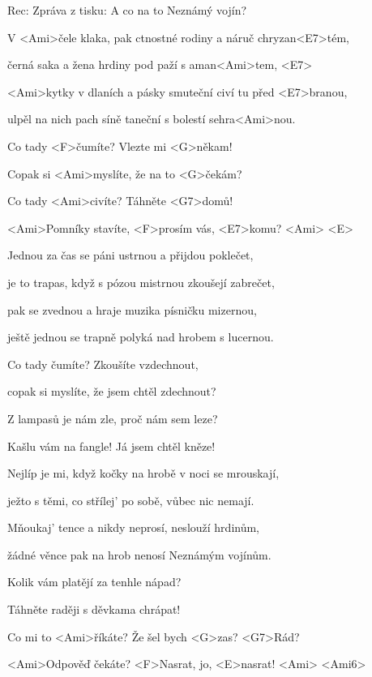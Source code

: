 

Rec: Zpráva z tisku:  A co na to Neznámý vojín?

\zs
V <Ami>čele klaka, pak ctnostné rodiny a náruč chryzan<E7>tém,

černá saka a žena hrdiny pod paží s aman<Ami>tem, <E7>

<Ami>kytky v dlaních a pásky smuteční civí tu před <E7>branou,

ulpěl na nich pach síně taneční s bolestí sehra<Ami>nou.
\ks

\zr
Co tady <F>čumíte? Vlezte mi <G>někam!

Copak si <Ami>myslíte, že na to <G>čekám?

Co tady <Ami>civíte? Táhněte <G7>domů!

<Ami>Pomníky stavíte, <F>prosím vás, <E7>komu? <Ami> <E>
\kr

\zs
Jednou za čas se páni ustrnou a přijdou poklečet,

je to trapas, když s pózou mistrnou zkoušejí zabrečet,

pak se zvednou a hraje muzika písničku mizernou,

ještě jednou se trapně polyká nad hrobem s lucernou.
\ks

\zr
Co tady čumíte? Zkoušíte vzdechnout,

copak si myslíte, že jsem chtěl zdechnout?

Z lampasů je nám zle, proč nám sem leze?

Kašlu vám na fangle! Já jsem chtěl kněze!
\kr

\zs
Nejlíp je mi, když kočky na hrobě v noci se mrouskají,

ježto s těmi, co střílej' po sobě, vůbec nic nemají.

Mňoukaj' tence a nikdy neprosí, neslouží hrdinům,

žádné věnce pak na hrob nenosí Neznámým vojínům.
\ks

\zr
Kolik vám platějí za tenhle nápad?

Táhněte raději s děvkama chrápat!

Co mi to <Ami>říkáte? Že šel bych <G>zas? <G7>Rád?

<Ami>Odpověď čekáte? <F>Nasrat, jo, <E>nasrat! <Ami> <Ami6>
\kr

\kp
